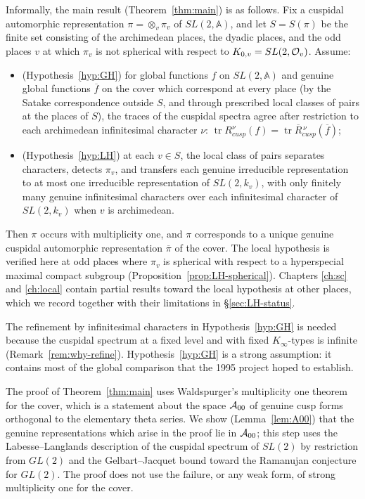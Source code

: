 \documentclass[12pt,letterpaper]{book}
\theoremstyle{plain}
\theoremstyle{definition}
\theoremstyle{remark}
\theoremstyle{remark}
\newcommand{\tr}{\operatorname{tr}}
\begin{document}
Informally, the main result (Theorem~\ref{thm:main}) is as follows.
Fix a cuspidal automorphic representation $\pi=\otimes_v\pi_v$ of
$SL(2,\mathbb{A})$, and let $S=S(\pi)$ be the finite set consisting of the
archimedean places, the dyadic places, and the odd places $v$ at which
$\pi_v$ is not spherical with respect to $K_{0,v}=SL(2,{\cal O}_v)$.
Assume:
\begin{itemize}
\item (Hypothesis~\ref{hyp:GH}) for global functions $f$ on
$SL(2,\mathbb{A})$ and genuine global functions $\overline{f}$ on the cover
which correspond at every place (by the Satake correspondence outside
$S$, and through prescribed local classes of pairs at the places of
$S$), the traces of the cuspidal spectra agree after restriction to
each archimedean infinitesimal character $\nu$:
$\tr R_{cusp}^\nu(f)=\tr \overline{R}{}_{cusp}^{\,\nu}(\overline{f})$;
\item (Hypothesis~\ref{hyp:LH}) at each $v\in S$, the local class of
pairs separates characters, detects $\pi_v$, and transfers each genuine
irreducible representation to at most one irreducible representation
of $SL(2,k_v)$, with only finitely many genuine infinitesimal
characters over each infinitesimal character of $SL(2,k_v)$ when $v$
is archimedean.
\end{itemize}
Then $\pi$ occurs with multiplicity one, and $\pi$ corresponds to a
unique genuine cuspidal automorphic representation $\overline{\pi}$ of
the cover. The local hypothesis is verified here at odd places where
$\pi_v$ is spherical with respect to a hyperspecial maximal compact
subgroup (Proposition~\ref{prop:LH-spherical}).
Chapters \ref{ch:sc} and \ref{ch:local} contain partial results toward
the local hypothesis at other places, which we record together with
their limitations in \S\ref{sec:LH-status}.

The refinement by infinitesimal characters in Hypothesis~\ref{hyp:GH} is
needed because the cuspidal spectrum at a fixed level and with fixed
$K_\infty$-types is infinite (Remark~\ref{rem:why-refine}). Hypothesis~\ref{hyp:GH} is a strong assumption: it
contains most of the global comparison that the 1995 project hoped to
establish.

The proof of Theorem~\ref{thm:main} uses Waldspurger's multiplicity one
theorem for the cover, which is a statement about the space ${\cal A}_{00}$
of genuine cusp forms orthogonal to the elementary theta series. We show
(Lemma~\ref{lem:A00}) that the genuine representations which arise in
the proof lie in ${\cal A}_{00}$; this step uses the Labesse--Langlands
description of the cuspidal spectrum of $SL(2)$ by restriction from
$GL(2)$ and the Gelbart--Jacquet bound toward the Ramanujan conjecture
for $GL(2)$. The proof does not use the failure, or any weak form, of
strong multiplicity one for the cover.
\end{document}
